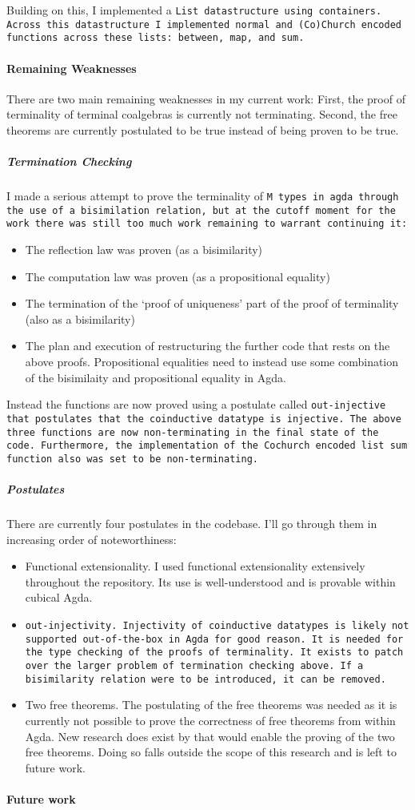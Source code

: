 Building on this, I implemented a \tt{List} datastructure using containers.
Across this datastructure I implemented normal and (Co)Church encoded functions across these lists: \tt{between}, \tt{map}, and \tt{sum}.

\paragraph{Remaining Weaknesses}
There are two main remaining weaknesses in my current work:
First, the proof of terminality of terminal coalgebras is currently not terminating.
Second, the free theorems are currently postulated to be true instead of being proven to be true.

\subparagraph{Termination Checking}
I made a serious attempt to prove the terminality of \tt{M} types in agda through the use of a bisimilation relation, but at the cutoff moment for the work there was still too much work remaining to warrant continuing it:
\begin{itemize}
  \item The reflection law was proven (as a bisimilarity)
  \item The computation law was proven (as a propositional equality)
  \item The termination of the `proof of uniqueness' part of the proof of terminality (also as a bisimilarity)
  \item The plan and execution of restructuring the further code that rests on the above proofs.
  Propositional equalities need to instead use some combination of the bisimilaity and propositional equality in Agda.
\end{itemize}
Instead the functions are now proved using a postulate called \tt{out-injective} that postulates that the coinductive datatype is injective.
The above three functions are now non-terminating in the final state of the code.
Furthermore, the implementation of the Cochurch encoded list \tt{sum} function also was set to be non-terminating.

\subparagraph{Postulates}
There are currently four postulates in the codebase.
I'll go through them in increasing order of noteworthiness:
\begin{itemize}
  \item Functional extensionality.
  I used functional extensionality extensively throughout the repository.
  Its use is well-understood and is provable within cubical Agda.
  \item \tt{out}-injectivity.
  Injectivity of coinductive datatypes is likely not supported out-of-the-box in Agda for good reason.
  It is needed for the type checking of the proofs of terminality.
  It exists to patch over the larger problem of termination checking above.
  If a bisimilarity relation were to be introduced, it can be removed.
  \item Two free theorems.
  The postulating of the free theorems was needed as it is currently not possible to prove the correctness of free theorems from within Agda.
  New research does exist by \cite{Muylder2024} that would enable the proving of the two free theorems.
  Doing so falls outside the scope of this research and is left to future work.
\end{itemize}

\paragraph{Future work}

